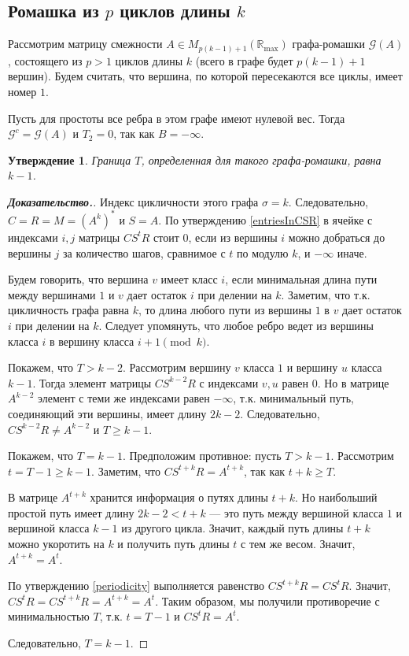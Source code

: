 \documentclass[12pt]{article}
\newtheorem{proposition}[theorem]{Утверждение}
\begin{document}
\subsection{Ромашка из $p$ циклов длины $k$}
Рассмотрим матрицу смежности $A \in M_{p(k - 1) + 1}(\mathbb{R}_{\max})$ графа-ромашки $\mathcal{G}(A)$, состоящего из $p > 1$ циклов длины $k$ (всего в графе будет $p(k - 1) + 1$ вершин). Будем считать, что вершина, по которой пересекаются все циклы, имеет номер $1$.

Пусть для простоты все ребра в этом графе имеют нулевой вес. Тогда $\mathcal{G}^c = \mathcal{G}(A)$ и $T_2 = 0$, так как $B = -\infty$.
\begin{proposition} Граница $T$, определенная для такого графа-ромашки, равна $k - 1$.
\label{chamomile}
\end{proposition}
\begin{proof}[\textbf{Доказательство.}]
Индекс цикличности этого графа $\sigma = k$. Следовательно, $C = R = M = (A^k)^*$ и $S = A$. По утверждению \ref{entriesInCSR} в ячейке с индексами $i, j$ матрицы $CS^tR$ стоит $0$, если из вершины $i$ можно добраться до вершины $j$ за количество шагов, сравнимое с $t$ по модулю $k$, и $-\infty$ иначе.

Будем говорить, что вершина $v$ имеет класс $i$, если минимальная длина пути между вершинами $1$ и $v$ дает остаток $i$ при делении на $k$. Заметим, что т.к. цикличность графа равна $k$, то длина любого пути из вершины $1$ в $v$ дает остаток $i$ при делении на $k$. Следует упомянуть, что любое ребро ведет из вершины класса $i$ в вершину класса $i + 1 \pmod{k}$.

Покажем, что $T > k - 2$. Рассмотрим вершину $v$ класса $1$ и вершину $u$ класса $k - 1$. Тогда элемент матрицы $CS^{k - 2}R$ с индексами $v, u$ равен $0$. Но в матрице $A^{k - 2}$ элемент с теми же индексами равен $-\infty$, т.к. минимальный путь, соединяющий эти вершины, имеет длину $2k - 2$. Следовательно, $CS^{k - 2}R \neq A^{k - 2}$ и $T \ge k - 1$.

Покажем, что $T = k - 1$. Предположим противное: пусть $T > k - 1$. Рассмотрим $t = T - 1 \ge k - 1$. Заметим, что $CS^{t + k}R = A^{t + k}$, так как $t + k \ge T$.

В матрице $A^{t+k}$ хранится информация о путях длины $t+k$. Но наибольший простой путь имеет длину $2k - 2 < t + k$ --- это путь между вершиной класса $1$ и вершиной класса $k - 1$ из другого цикла. Значит, каждый путь длины $t+k$ можно укоротить на $k$ и получить путь длины $t$ с тем же весом. Значит, $A^{t+k} = A^t$.

По утверждению \ref{periodicity} выполняется равенство $CS^{t + k}R = CS^tR$. Значит, $CS^tR = CS^{t + k}R = A^{t+k} = A^t$. Таким образом, мы получили противоречие с минимальностью $T$, т.к. $t = T - 1$ и $CS^tR = A^t$.

Следовательно, $T = k - 1$.
\end{proof}
\end{document}
